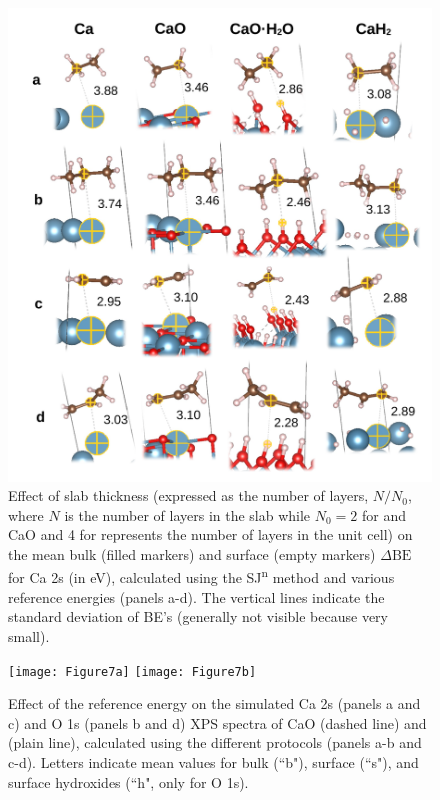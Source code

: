 \documentclass[journal=jpccck,manuscript=article]{achemso}
\def\dbe{\ensuremath{\Delta\text{BE}}}
\begin{document}
\begin{figure}[p]
	\centering
	\includegraphics[width=\linewidth]{Figure6}
	\caption{Effect of slab thickness (expressed as the number of layers, $N/N_0$, where $N$ is the number of layers in the slab while $N_0 = 2$ for  and CaO and 4 for  represents the number of layers in the unit cell)  on the mean bulk (filled markers) and surface (empty markers) \dbe{} for Ca 2s (in \si{\electronvolt}), calculated using the SJ\textsuperscript{n} method and various reference energies (panels a-d). The vertical lines indicate the standard deviation of BE's (generally not visible because very small).}
	\label{fig:slabsthicknessSJn}
\end{figure}


\begin{figure}[p]
	\centering
	\texttt{[image: Figure7a]}
	\texttt{[image: Figure7b]}
	\caption{Effect of the reference energy on the simulated Ca 2s (panels a and c)  and O 1s (panels b and d) XPS spectra of CaO (dashed line)  and  (plain line), calculated using the different protocols (panels a-b and c-d). Letters indicate mean values for bulk (``b"), surface (``s"), and surface hydroxides (``h", only for   O 1s).}
	\label{fig:slabOH2}
\end{figure}
\end{document}
